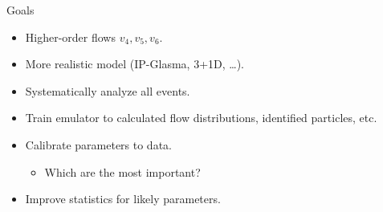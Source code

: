 \documentclass{beamer}
\begin{document}
\begin{frame}{Goals}
  \begin{itemize}
    \item Higher-order flows $v_4,v_5,v_6$.
    \item More realistic model (IP-Glasma, 3+1D, \ldots).
    \item Systematically analyze all events.
    \item Train emulator to calculated flow distributions, identified particles, etc.
    \item Calibrate parameters to data.
      \begin{itemize}
        \item Which are the most important?
      \end{itemize}
    \item Improve statistics for likely parameters.
  \end{itemize}
\end{frame}
\end{document}

